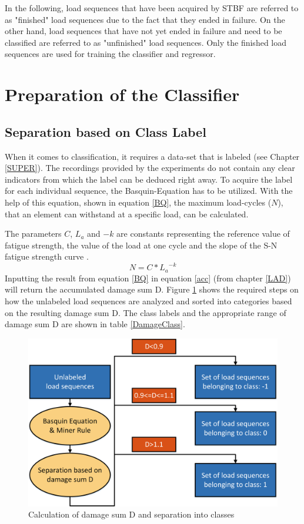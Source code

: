 In the following, load sequences that have been acquired by STBF are referred to as "finished" load sequences due to the fact that they ended in failure. On the other hand, load sequences that have not yet ended in failure and need to be classified are referred to as "unfinished" load sequences. Only the finished load sequences are used for training the classifier and regressor.
\newpage

\section{Preparation of the Classifier}
\subsection{Separation based on Class Label}\label{SBOC}
When it comes to classification, it requires a data-set that is labeled (see Chapter \ref{SUPER}). The recordings provided by the experiments do not contain any clear indicators from which the label can be deduced right away. To acquire the label for each individual sequence, the Basquin-Equation \cite{DIN50100} has to be utilized. With the help of this equation, shown in equation \ref{BQ}, the maximum load-cycles (\(N\)), that an element can withstand at a specific load, can be calculated.

The parameters \(C\), \(L_a\) and \(-k\) are constants representing the reference value of fatigue strength, the value of the load at one cycle and the slope of the S-N fatigue strength curve \cite{SOLID}. 
\begin{equation}\label{BQ}
	N = {C}*{L_a}^{-k}
\end{equation}
Inputting the result from equation \ref{BQ} in equation \ref{acc} (from chapter \ref{LAD}) will return the accumulated damage sum D. Figure \ref{fig:SBC} shows the required steps on how the unlabeled load sequences are analyzed and sorted into categories based on the resulting damage sum D. The class labels and the appropriate range of damage sum D are shown in table \ref{DamageClass}.

\begin{figure}[H]
	\centering
	\includegraphics[width=0.8\linewidth]{IMGs/SBC.png}
	\caption{Calculation of damage sum D and separation into classes}
	\label{fig:SBC}
\end{figure}

